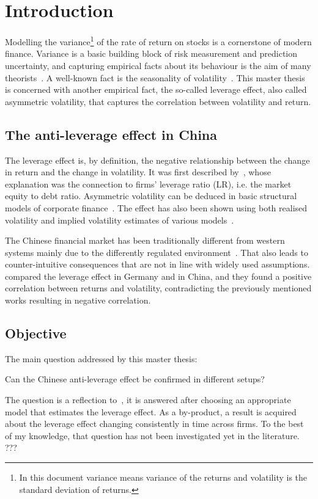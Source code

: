 \section{Introduction}

Modelling the variance\footnote{In this document variance means variance of the returns and volatility is the standard deviation of returns.} of the rate of return on stocks is a cornerstone of modern finance.
Variance is a basic building block of risk measurement and prediction uncertainty, and capturing empirical facts about its behaviour is the aim of many theorists~\citep{Christie1982}.
A well-known fact is the seasonality of volatility~\citep{schwert1989why}.
This master thesis is concerned with another empirical fact, the so-called leverage effect, also called asymmetric volatility, that captures the correlation between volatility and return.

\subsection{The anti-leverage effect in China}

The leverage effect is, by definition, the negative relationship between the change in return and the change in volatility.
It was first described by~\citet{black1976studies}, whose explanation was the connection to firms' leverage ratio (LR), i.e. the market equity to debt ratio.
Asymmetric volatility can be deduced in basic structural models of corporate finance~\citep{Christie1982}.
The effect has also been shown using both realised volatility and implied volatility estimates of various models~\citep{Bouchaud2001,Harvey1996,Christie1982,french1987expected}.

The Chinese financial market has been traditionally different from western systems mainly due to the differently regulated environment~\citep{GORDON2003}.
That also leads to counter-intuitive consequences that are not in line with widely used assumptions.
\citet{Shen2009} compared the leverage effect in Germany and in China, and they found a positive correlation between returns and volatility, contradicting the previously mentioned works resulting in negative correlation.


\subsection{Objective}

The main question addressed by this master thesis:
\begin{center}
	Can the Chinese anti-leverage effect be confirmed in different setups?
\end{center}
The question is a reflection to~\citet{Shen2009}, it is answered after choosing an appropriate model that estimates the leverage effect.
As a by-product, a result is acquired about the leverage effect changing consistently in time across firms.
To the best of my knowledge, that question has not been investigated yet in the literature. ???
